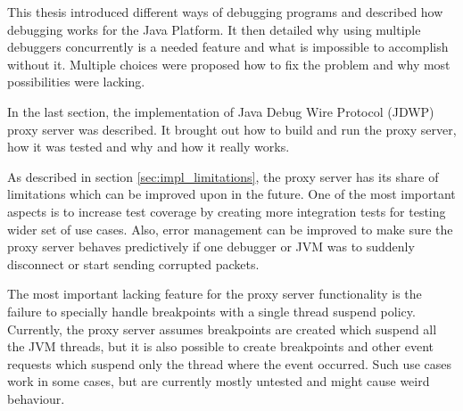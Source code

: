 \documentclass[..thesis.tex]{subfiles}
\begin{document}
This thesis introduced different ways of debugging programs and described how debugging works for the Java Platform.
It then detailed why using multiple debuggers concurrently is a needed feature and what is impossible to accomplish without it.
Multiple choices were proposed how to fix the problem and why most possibilities were lacking.

In the last section, the implementation of Java Debug Wire Protocol (JDWP) proxy server was described.
It brought out how to build and run the proxy server, how it was tested and why and how it really works.

As described in section \ref{sec:impl_limitations}, the proxy server has its share of limitations which can be improved upon in the future.
One of the most important aspects is to increase test coverage by creating more integration tests for testing wider set of use cases.
Also, error management can be improved to make sure the proxy server behaves predictively if one debugger or JVM was to suddenly disconnect or start sending corrupted packets.

The most important lacking feature for the proxy server functionality is the failure to specially handle breakpoints with a single thread suspend policy. 
Currently, the proxy server assumes breakpoints are created which suspend all the JVM threads, but it is also possible to create breakpoints and other event requests which suspend only the thread where the event occurred.
Such use cases work in some cases, but are currently mostly untested and might cause weird behaviour.
\end{document}
